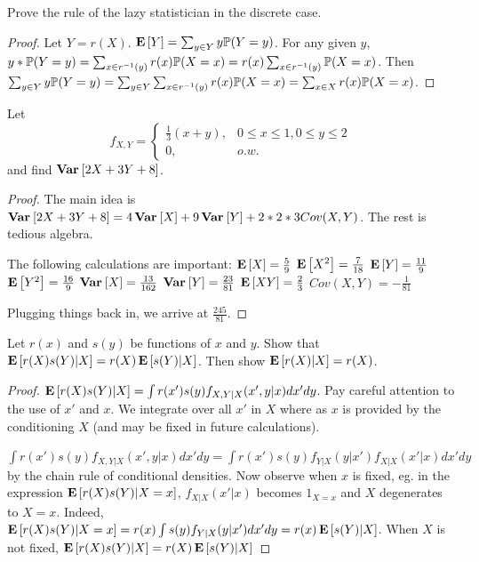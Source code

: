 \documentclass[10pt]{article}
\begin{document}
\setcounter{exercise}{5}
\begin{exercise}
    Prove the rule of the lazy statistician in the discrete case.
\end{exercise}
\begin{proof}
    Let $Y = r(X)$. $\E{Y} = \sum_{y \in Y} y \P(Y = y)$. For any given $y$, $y * \P(Y
    = y) = \sum_{x \in r^{-1}(y)} r(x) \P(X = x) = r(x) \sum_{x \in r^{-1}(y)}
    \P(X = x)$. Then $\sum_{y \in Y} y \P(Y = y) = \sum_{y \in Y} \sum_{x \in
    r^{-1}(y)} r(x) \P(X = x) = \sum_{x \in X} r(x) \P(X = x)$.
\end{proof}

\setcounter{exercise}{14}
\begin{exercise}
    Let
    \[
        f_{X,Y} = \begin{cases}
            \frac{1}{3}(x+y), &0\leq x \leq 1, 0 \leq y \leq 2 \\
            0, & o.w.
        \end{cases}
    \] and find $\Var{2X + 3Y + 8}$.
\end{exercise}

\begin{proof}
    The main idea is $\Var{2X + 3Y + 8} = 4\Var{X} + 9\Var{Y} + 2 * 2 * 3 Cov(X, Y)$. The rest is tedious algebra.

    The following calculations are important: $\E{X} = \frac{5}{9}$
    $\E{X^2} = \frac{7}{18}$
    $\E{Y} = \frac{11}{9}$
    $\E{Y^2} = \frac{16}{9}$
    $\Var{X} = \frac{13}{162}$
    $\Var{Y} = \frac{23}{81}$
    $\E{XY} = \frac{2}{3}$
    $Cov(X, Y) = -\frac{1}{81}$

    Plugging things back in, we arrive at $\frac{245}{81}$.
\end{proof}

\setcounter{exercise}{15}
\begin{exercise}
    Let $r(x)$ and $s(y)$ be functions of $x$ and $y$. Show that
    $\E{r(X)s(Y)|X} = r(X)\E{s(Y)|X}$. Then show $\E{r(X)|X} = r(X)$.
\end{exercise}

\begin{proof}
    $\E{r(X)s(Y)|X} = \int r(x')s(y) f_{X,Y|X}(x',y|x) dx' dy$. Pay careful
    attention to the use of $x'$ and $x$. We integrate over all $x'$ in $X$ where as $x$
    is provided by the conditioning $X$ (and may be fixed in future
    calculations).

    $\int r(x')s(y) f_{X,Y|X}(x',y|x) dx' dy = \int r(x')s(y) f_{Y|X}(y|x')
    f_{X|X}(x'|x) dx' dy$ by the chain rule of conditional densities. Now
    observe when $x$ is fixed, eg. in the expression $\E{r(X)s(Y)|X=x}$,
    $f_{X|X}(x'|x)$ becomes $1_{X=x}$ and $X$ degenerates to $X=x$. Indeed, 
    $\E{r(X)s(Y)|X=x} = r(x) \int s(y) f_{Y|X}(y|x') dx' dy = r(x) \E{s(Y)|X}$.
    When $X$ is not fixed, $\E{r(X)s(Y)|X} = r(X)\E{s(Y)|X}$
\end{proof}
\end{document}
